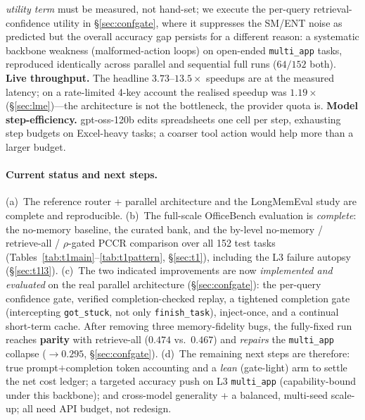 \documentclass[10pt,twocolumn]{article}
\newcommand{\code}[1]{\texttt{\small #1}}
\begin{document}
\emph{utility term} must be measured, not hand-set; we execute the per-query
retrieval-confidence utility in \S\ref{sec:confgate}, where it suppresses the SM/ENT noise
as predicted but the overall accuracy gap persists for a different reason: a systematic
backbone weakness (malformed-action loops) on open-ended \code{multi\_app} tasks, reproduced
identically across parallel and sequential full runs ($64/152$ both). \textbf{Live
throughput.} The headline $3.73$--$13.5\times$ speedups are at the measured latency;
on a rate-limited 4-key account the realised speedup was $1.19\times$
(\S\ref{sec:lme})---the architecture is not the bottleneck, the provider quota is.
\textbf{Model step-efficiency.} gpt-oss-120b edits spreadsheets one cell per step,
exhausting step budgets on Excel-heavy tasks; a coarser tool action would help more
than a larger budget.

\paragraph{Current status and next steps.} (a)~The reference router + parallel
architecture and the LongMemEval study are complete and reproducible. (b)~The full-scale
OfficeBench evaluation is \emph{complete}: the no-memory baseline, the curated bank, and
the by-level no-memory / retrieve-all / $\rho$-gated PCCR comparison over all 152 test
tasks (Tables~\ref{tab:t1main}--\ref{tab:t1pattern}, \S\ref{sec:t1}), including the L3
failure autopsy (\S\ref{sec:t1l3}). (c)~The two indicated improvements are now
\emph{implemented and evaluated} on the real parallel architecture (\S\ref{sec:confgate}):
the per-query confidence gate, verified completion-checked replay, a tightened completion gate
(intercepting \code{got\_stuck}, not only \code{finish\_task}), inject-once, and a continual
short-term cache. After removing three memory-fidelity bugs, the fully-fixed run reaches
\textbf{parity} with retrieve-all ($0.474$ vs.\ $0.467$) and \emph{repairs} the \code{multi\_app}
collapse ($\to0.295$, \S\ref{sec:confgate}). (d)~The remaining next steps are therefore:
true prompt$+$completion token accounting and a \emph{lean} (gate-light) arm to settle the net
cost ledger; a targeted accuracy push on L3 \code{multi\_app} (capability-bound under this
backbone); and cross-model generality + a balanced, multi-seed scale-up; all need API budget,
not redesign.

\end{document}
